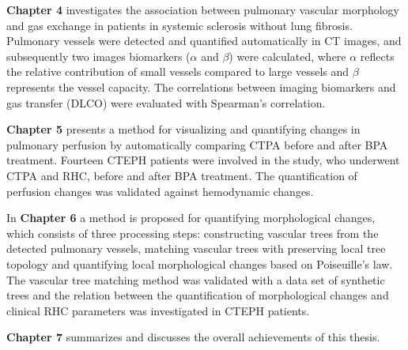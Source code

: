 \textbf{Chapter 4} investigates the association between pulmonary vascular morphology and gas exchange in patients in systemic sclerosis without lung fibrosis. Pulmonary vessels were detected and quantified automatically in CT images, and subsequently two images biomarkers ($\alpha$ and $\beta$) were calculated, where $\alpha$ reflects the relative contribution of small vessels compared to large vessels and $\beta$ represents the vessel  capacity. The correlations between imaging biomarkers and gas transfer (DLCO) were evaluated with Spearman's correlation.

\textbf{Chapter 5} presents a method for visualizing and quantifying changes in pulmonary perfusion by automatically comparing CTPA before and after BPA treatment. Fourteen CTEPH patients were involved in the study, who underwent CTPA and RHC, before and after BPA treatment. The quantification of perfusion changes was validated against hemodynamic changes.

In \textbf{Chapter 6} a method is proposed for quantifying morphological changes, which consists of three processing steps: constructing vascular trees from the detected pulmonary vessels, matching vascular trees with preserving local tree topology and quantifying local morphological changes based on Poiseuille{'}s law. The vascular tree matching method was validated with a data set of synthetic trees and the relation between the quantification of morphological changes and clinical RHC parameters was investigated in CTEPH patients. 

\textbf{Chapter 7} summarizes and discusses the overall achievements of this thesis.

